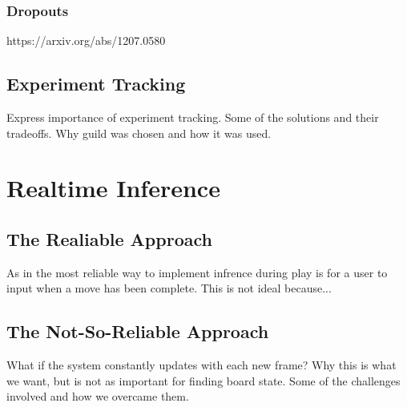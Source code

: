 \subsubsection{Dropouts}
https://arxiv.org/abs/1207.0580

\subsection{Experiment Tracking}
Express importance of experiment tracking.  Some of the solutions \cite{} and their tradeoffs.
Why guild was chosen and how it was used.


\section{Realtime Inference}

\subsection{The Realiable Approach}
As in \cite{} the most reliable way to implement infrence during play is for a user to input when a move
has been complete.
This is not ideal because...

\subsection{The Not-So-Reliable Approach}
What if the system constantly updates with each new frame?
Why this is what we want, but is not as important for finding board state.
Some of the challenges involved and how we overcame them.